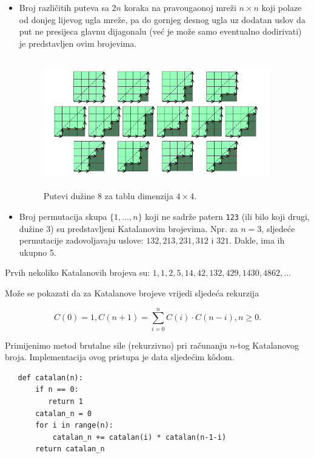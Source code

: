  \begin{itemize}
 	\item Broj različitih puteva sa $2n$ koraka na pravougaonoj mreži $n \times n$ koji polaze od 	donjeg lijevog ugla mreže, pa do gornjeg desnog ugla uz dodatan uslov da put ne presijeca glavnu dijagonalu (već je može samo eventualno dodirivati) je predstavljen ovim brojevima.
 	
 	\begin{figure}[H]
 		\centering
 		\includegraphics[width=280pt,height=160pt]{slike/catalan-net.png}
 		\caption{Putevi dužine 8 za tablu dimenzija $4\times 4$.} \label{fig:catalan-n-4}
 	\end{figure}
 	\item Broj permutacija skupa $\{1, \ldots, n \}$ koji ne sadrže patern \texttt{123} (ili bilo koji drugi, dužine 3) su predstavljeni Katalanovim brojevima. Npr. za $n = 3$, sljedeće permutacije zadovoljavaju uslove: $132,
 	213, 231, 312$ i $321$.  Dakle, ima ih ukupno 5. 
 \end{itemize}
 
 Prvih nekoliko Katalanovih brojeva su: $1, 1, 2, 5, 14, 42, 132,
 429, 1430, 4862, \ldots $
 
 
 Može se pokazati da za Katalanove brojeve vrijedi sljedeća rekurzija
 
 $$C(0) = 1, C(n+1) = \sum_{i=0}^{n} C(i) \cdot C(n-i), n \geq  0.$$
 
 Primijenimo metod brutalne sile (rekurzivno) pri računanju $n$-tog Katalanovog broja. Implementacija ovog pristupa je data sljedećim k\^odom. 
 
 \begin{verbatim}
   def catalan(n):
       if n == 0:
          return 1
       catalan_n = 0 
       for i in range(n): 
           catalan_n += catalan(i) * catalan(n-1-i) 
       return catalan_n
        
 \end{verbatim}
  
